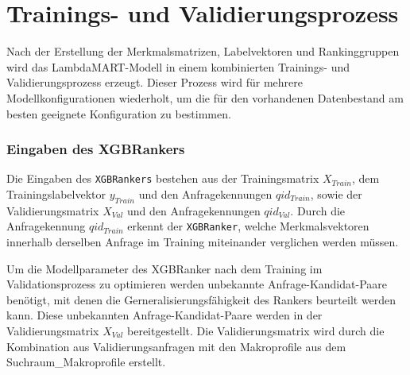 \begin{itemize}



\end{itemize}


\section{Trainings- und Validierungsprozess} 
\label{sec:trainings_und_validierungsprozess} 


Nach der Erstellung der Merkmalsmatrizen, Labelvektoren und Rankinggruppen wird das LambdaMART-Modell in einem kombinierten Trainings- und Validierungsprozess erzeugt. 
Dieser Prozess wird für mehrere Modellkonfigurationen wiederholt, um die für den vorhandenen Datenbestand am besten geeignete Konfiguration zu bestimmen. 

\subsubsection{Eingaben des XGBRankers} 

Die Eingaben des \texttt{XGBRankers} bestehen aus der Trainingsmatrix \(X_{Train}\), dem Trainingslabelvektor \(y_{Train}\) und den Anfragekennungen \(qid_{Train}\), sowie der Validierungsmatrix \(X_{Val}\) und den Anfragekennungen \(qid_{Val}\). 
Durch die Anfragekennung \(qid_{Train}\) erkennt der \texttt{XGBRanker}, welche Merkmalsvektoren innerhalb derselben Anfrage im Training miteinander verglichen werden müssen. 

Um die Modellparameter des XGBRanker nach dem Training im Validationsprozess zu optimieren werden unbekannte Anfrage-Kandidat-Paare benötigt, mit denen die Gerneralisierungsfähigkeit des Rankers beurteilt werden kann.
Diese unbekannten Anfrage-Kandidat-Paare werden in der Validierungsmatrix \(X_{Val}\) bereitgestellt. Die Validierungsmatrix wird durch die Kombination aus Validierungsanfragen mit den Makroprofile aus dem Suchraum\_Makroprofile erstellt.

